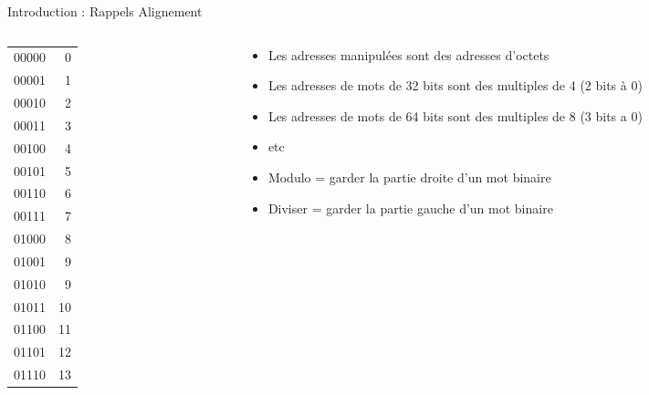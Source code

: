 \begin{Frame}{Introduction : Rappels Alignement}
 \begin{columns}[t]
  \begin{column}{\BW}
    \begin{block}{}
      \begin{tabular}{r r}\hline
        00000&0\\
        00001&1\\
        00010&2\\
        00011&3\\ \hline
        00100&4\\
        00101&5\\
        00110&6\\
        00111&7\\ \hline \hline
        01000&8\\
        01001&9\\
        01010&9\\
        01011&10\\ \hline
        01100&11\\
        01101&12\\
        01110&13\\
      \end{tabular}
    \end{block}
  \end{column}
  \begin{column}{\BW}
    \begin{block}{}
      \begin{itemize}
      \item Les adresses manipulées sont des adresses d'octets
      \item Les adresses de mots de 32 bits sont des multiples de 4 (2
        bits à 0)
      \item Les adresses de mots de 64 bits sont des multiples de 8 (3
        bits a 0)
      \item etc
      \end{itemize}
    \end{block}
    \begin{block}{}
      \begin{itemize}
      \item  Modulo = garder la partie droite d'un mot binaire
      \item  Diviser = garder la partie gauche d'un mot binaire
      \end{itemize}
    \end{block}
  \end{column}

 \end{columns}
\end{Frame}
